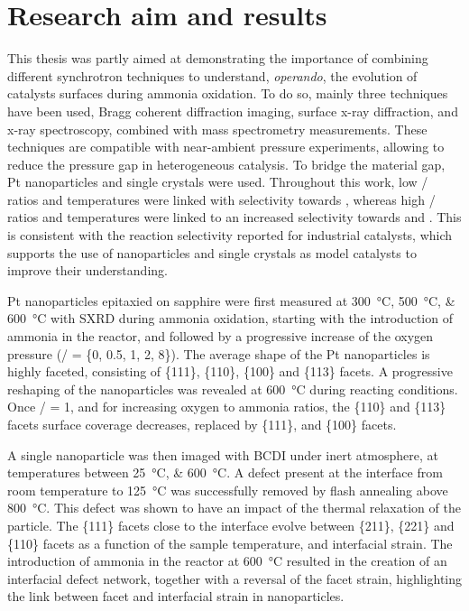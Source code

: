 \section{Research aim and results}

This thesis was partly aimed at demonstrating the importance of combining different synchrotron techniques to understand, \textit{operando}, the evolution of catalysts surfaces during ammonia oxidation.
To do so, mainly three techniques have been used, Bragg coherent diffraction imaging, surface x-ray diffraction, and x-ray spectroscopy, combined with mass spectrometry measurements.
These techniques are compatible with near-ambient pressure experiments, allowing to reduce the pressure gap in heterogeneous catalysis.
To bridge the material gap, Pt nanoparticles and single crystals were used.
Throughout this work, low / ratios and temperatures were linked with selectivity towards , whereas high / ratios and temperatures were linked to an increased selectivity towards  and .
This is consistent with the reaction selectivity reported for industrial catalysts, which supports the use of nanoparticles and single crystals as model catalysts to improve their understanding.

Pt nanoparticles epitaxied on sapphire were first measured at \qtylist{300;500;600}{\degreeCelsius} with SXRD during ammonia oxidation, starting with the introduction of ammonia in the reactor, and followed by a progressive increase of the oxygen pressure (/ = \{0, 0.5, 1, 2, 8\}).
The average shape of the Pt nanoparticles is highly faceted, consisting of \{111\}, \{110\}, \{100\} and \{113\} facets.
A progressive reshaping of the nanoparticles was revealed at \qty{600}{\degreeCelsius} during reacting conditions.
Once / = 1, and for increasing oxygen to ammonia ratios, the \{110\} and \{113\} facets surface coverage decreases, replaced by \{111\}, and \{100\} facets.

A single nanoparticle was then imaged with BCDI under inert atmosphere, at temperatures between \qtylist{25;600}{\degreeCelsius}.
A defect present at the interface from room temperature to \qty{125}{\degreeCelsius} was successfully removed by flash annealing above \qty{800}{\degreeCelsius}.
This defect was shown to have an impact of the thermal relaxation of the particle.
The \{111\} facets close to the interface evolve between \{211\}, \{221\} and \{110\} facets as a function of the sample temperature, and interfacial strain.
The introduction of ammonia in the reactor at \qty{600}{\degreeCelsius} resulted in the creation of an interfacial defect network, together with a reversal of the facet strain, highlighting the link between facet and interfacial strain in nanoparticles.

